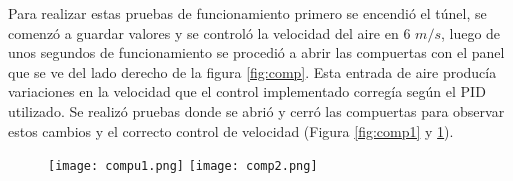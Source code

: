 Para realizar estas pruebas de funcionamiento primero se encendió el túnel, se comenzó a guardar valores y se controló la velocidad del aire en 6 $m/s$, luego de unos segundos de funcionamiento se procedió a abrir las compuertas con el panel que se ve del lado derecho de la figura \ref{fig:comp}. Esta entrada de aire producía variaciones en la velocidad que el control implementado corregía según el PID utilizado. Se realizó pruebas donde se abrió y cerró las compuertas para observar estos cambios y el correcto control de velocidad (Figura \ref{fig:comp1} y \ref{fig:comp2}).


\begin{figure}[H]
	\centering
	\texttt{[image: compu1.png]}
	\label{fig:comp1}
	\texttt{[image: comp2.png]}
	\label{fig:comp2}
\end{figure}



    \newpage